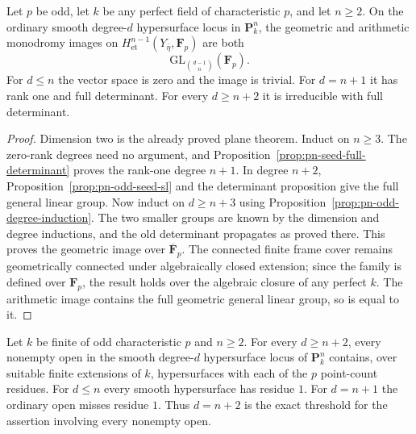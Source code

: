 \begin{theorem}\label{thm:pn-odd-full-groups}
Let $p$ be odd, let $k$ be any perfect field of characteristic
$p$, and let $n\geq2$.  On the ordinary smooth degree-$d$
hypersurface locus in $\mathbf P^n_k$, the geometric and
arithmetic monodromy images on
$H^{n-1}_{\mathrm{et}}(Y_{\bar\eta},\mathbf F_p)$ are both
\[
 \mathrm{GL}_{\binom{d-1}{n}}(\mathbf F_p).
\]
For $d\leq n$ the vector space is zero and the image is trivial.
For $d=n+1$ it has rank one and full determinant.
For every $d\geq n+2$ it is irreducible with full determinant.
\end{theorem}

\begin{proof}
Dimension two is the already proved plane theorem.
Induct on $n\geq3$.  The zero-rank degrees need no argument,
and Proposition~\ref{prop:pn-seed-full-determinant} proves the
rank-one degree $n+1$.  In degree $n+2$,
Proposition~\ref{prop:pn-odd-seed-sl} and the determinant
proposition give the full general linear group.
Now induct on $d\geq n+3$ using
Proposition~\ref{prop:pn-odd-degree-induction}.
The two smaller groups are known by the dimension and degree
inductions, and the old determinant propagates as proved there.
This proves the geometric image over $\overline{\mathbf F}_p$.
The connected finite frame cover remains geometrically
connected under algebraically closed extension; since the
family is defined over $\mathbf F_p$, the result holds over
the algebraic closure of any perfect $k$.  The arithmetic
image contains the full geometric general linear group, so
is equal to it.
\end{proof}

\begin{corollary}\label{cor:pn-odd-all-residues-sharp}
Let $k$ be finite of odd characteristic $p$ and $n\geq2$.
For every $d\geq n+2$, every nonempty open in the smooth
degree-$d$ hypersurface locus of $\mathbf P^n_k$ contains,
over suitable finite extensions of $k$, hypersurfaces with
each of the $p$ point-count residues.
For $d\leq n$ every smooth hypersurface has residue $1$.
For $d=n+1$ the ordinary open misses residue $1$.
Thus $d=n+2$ is the exact threshold for the assertion involving
every nonempty open.
\end{corollary}

